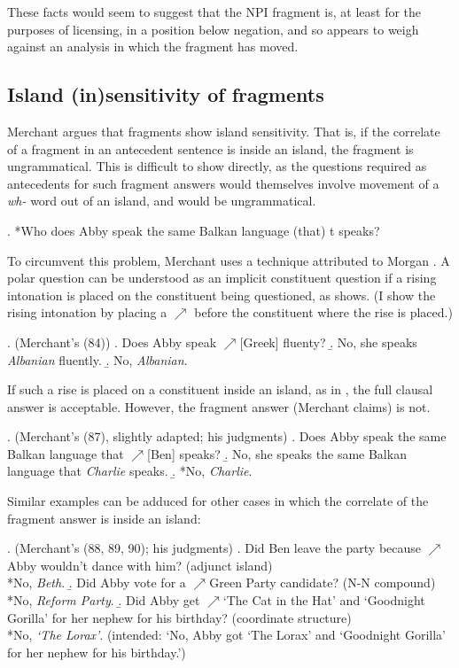 \documentclass[11pt,letterpaper]{article}
\begin{document}
These facts would seem to suggest that the NPI fragment is, at least for the purposes of licensing, in a position below negation, and so appears to weigh against an analysis in which the fragment has moved.

\subsection{Island (in)sensitivity of fragments}\label{sec:island-insensitivity}

Merchant argues that fragments show island sensitivity. That is, if the correlate of a fragment in an antecedent sentence is inside an island, the fragment is ungrammatical. This is difficult to show directly, as the questions required as antecedents for such fragment answers would themselves involve movement of a {\it wh-} word out of an island, and would be ungrammatical.

\ex. 	*Who does Abby speak the same Balkan language (that) t speaks?

To circumvent this problem, Merchant uses a technique attributed to Morgan %
. A polar question can be understood as an implicit constituent question if a rising intonation is placed on the constituent being questioned, as \Next shows. (I show the rising intonation by placing a $\nearrow$ before the constituent where the rise is placed.)

\ex. (Merchant's (84))
	\a. Does Abby speak $\nearrow$[Greek] fluenty?
	\b. No, she speaks \emph{Albanian} fluently.
	\b. No, \emph{Albanian}.
	
If such a rise is placed on a constituent inside an island, as in \Next[a], the full clausal answer is acceptable. However, the fragment answer (Merchant claims) is not.

\ex. 	(Merchant's (87), slightly adapted; his judgments)
	\a. Does Abby speak the same Balkan language that $\nearrow$[Ben] speaks?
	\b. No, she speaks the same Balkan language that \emph{Charlie} speaks.
	\b. *No, {\it Charlie}.

Similar examples can be adduced for other cases in which the correlate of the fragment answer is inside an island:

\ex. 	(Merchant's (88, 89, 90); his judgments) \label{ex:merchant-island-sensitivity}
	\a. Did Ben leave the party because $\nearrow$Abby wouldn't dance with him? \hfill (adjunct island)\\
	{}*No, \emph{Beth}.
	\b. Did Abby vote for a $\nearrow$Green Party candidate? \hfill (N-N compound)\\
	{}*No, \emph{Reform Party}. 
	\b. Did Abby get $\nearrow$`The Cat in the Hat' and `Goodnight Gorilla' for her nephew for his birthday? \hfill (coordinate structure)\\
	{}*No, \emph{`The Lorax'}. (intended: `No, Abby got `The Lorax' and `Goodnight Gorilla' for her nephew for his birthday.')
\end{document}
